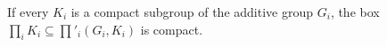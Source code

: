 If every $K_i$ is a compact subgroup of the additive group $G_i$, the box $\prod_iK_i\subseteq\prod'_i(G_i,K_i)$ is compact.
